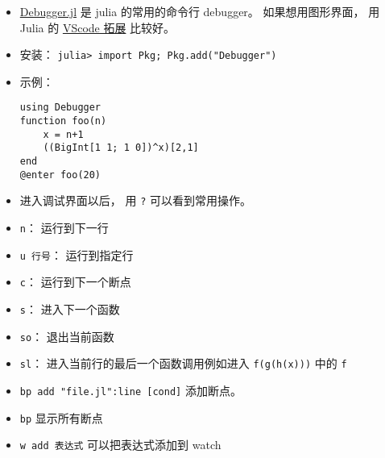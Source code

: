 
\begin{issues}
\issueDraft
\end{issues}

\begin{itemize}
\item \href{https://github.com/JuliaDebug/Debugger.jl}{Debugger.jl} 是 julia 的常用的命令行 debugger。 如果想用图形界面， 用 Julia 的 \href{https://www.julia-vscode.org}{VScode 拓展} 比较好。
\item 安装： \verb|julia> import Pkg; Pkg.add("Debugger")|
\item 示例：
\begin{lstlisting}[language=none]
using Debugger
function foo(n)
    x = n+1
    ((BigInt[1 1; 1 0])^x)[2,1]
end
@enter foo(20)
\end{lstlisting}
\item 进入调试界面以后， 用 \verb|?| 可以看到常用操作。
\item \verb|n|： 运行到下一行
\item \verb|u 行号|： 运行到指定行
\item \verb|c|： 运行到下一个断点
\item \verb|s|： 进入下一个函数
\item \verb|so|： 退出当前函数
\item \verb|sl|： 进入当前行的最后一个函数调用例如进入 \verb|f(g(h(x)))| 中的 \verb|f|
\item \verb|bp add "file.jl":line [cond]| 添加断点。
\item \verb|bp| 显示所有断点
\item \verb|w add 表达式| 可以把表达式添加到 watch
\end{itemize}
